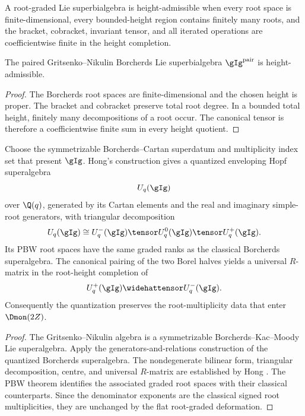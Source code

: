 \begin{definition}
A root-graded Lie superbialgebra is height-admissible when every root space is finite-dimensional, every bounded-height region contains finitely many roots, and the bracket, cobracket, invariant tensor, and all iterated operations are coefficientwise finite in the height completion.
\end{definition}

\begin{proposition}
The paired Gritsenko--Nikulin Borcherds Lie superbialgebra $\gIg^{\mathrm{pair}}$ is height-admissible.
\end{proposition}
\begin{proof}
The Borcherds root spaces are finite-dimensional and the chosen height is proper.  The bracket and cobracket preserve total root degree.  In a bounded total height, finitely many decompositions of a root occur.  The canonical tensor is therefore a coefficientwise finite sum in every height quotient.
\end{proof}

\begin{theorem}
Choose the symmetrizable Borcherds--Cartan superdatum and multiplicity index set that present $\gIg$.  Hong's construction gives a quantized enveloping Hopf superalgebra
\[
 U_q(\gIg)
\]
over $\Q(q)$, generated by its Cartan elements and the real and imaginary simple-root generators, with triangular decomposition
\[
 U_q(\gIg)\cong U_q^-(\gIg)\tensor U_q^0(\gIg)\tensor U_q^+(\gIg).
\]
Its PBW root spaces have the same graded ranks as the classical Borcherds superalgebra.  The canonical pairing of the two Borel halves yields a universal $R$-matrix in the root-height completion of
\[
 U_q^+(\gIg)\widehattensor U_q^-(\gIg).
\]
Consequently the quantization preserves the root-multiplicity data that enter $\Dmon(2Z)$.
\end{theorem}
\begin{proof}
The Gritsenko--Nikulin algebra is a symmetrizable Borcherds--Kac--Moody Lie superalgebra.  Apply the generators-and-relations construction of the quantized Borcherds superalgebra.  The nondegenerate bilinear form, triangular decomposition, centre, and universal $R$-matrix are established by Hong \cite{Hong98}.  The PBW theorem identifies the associated graded root spaces with their classical counterparts.  Since the denominator exponents are the classical signed root multiplicities, they are unchanged by the flat root-graded deformation.
\end{proof}

